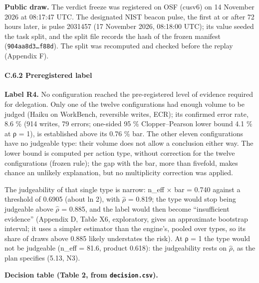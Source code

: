 \textbf{Public draw.} The verdict freeze was registered on OSF (cusv6) on 14 November 2026 at 08:17:47 UTC. The designated NIST beacon pulse, the first at or after 72 hours later, is pulse 2031457 (17 November 2026, 08:18:00 UTC); its value seeded the task split, and the split file records the hash of the frozen manifest (\texttt{904aa8d3…f88d}). The split was recomputed and checked before the replay (Appendix F).

\paragraph{C.6.2 Preregistered label}\label{c.6.2-preregistered-label}

\textbf{Label R4.} No configuration reached the pre-registered level of evidence required for delegation. Only one of the twelve configurations had enough volume to be judged (Haiku on WorkBench, reversible writes, ECR); its confirmed error rate, 8.6 \% (914 writes, 79 errors; one-sided 95 \% Clopper--Pearson lower bound 4.1 \% at ρ = 1), is established above its 0.76 \% bar. The other eleven configurations have no judgeable type: their volume does not allow a conclusion either way. The lower bound is computed per action type, without correction for the twelve configurations (frozen rule); the gap with the bar, more than fivefold, makes chance an unlikely explanation, but no multiplicity correction was applied.

The judgeability of that single type is narrow: n\_eff × bar = 0.740 against a threshold of 0.6905 (about ln 2), with \ensuremath{\hat{\rho}} = 0.819; the type would stop being judgeable above \ensuremath{\hat{\rho}} = 0.885, and the label would then become ``insufficient evidence'' (Appendix D, Table X6, exploratory, gives an approximate bootstrap interval; it uses a simpler estimator than the engine's, pooled over types, so its share of draws above 0.885 likely understates the risk). At ρ = 1 the type would not be judgeable (n\_eff = 81.6, product 0.618): the judgeability rests on \ensuremath{\hat{\rho}}, as the plan specifies (5.13, N3).

\textbf{Decision table (Table 2, from \texttt{decision.\allowbreak{}csv}).}

